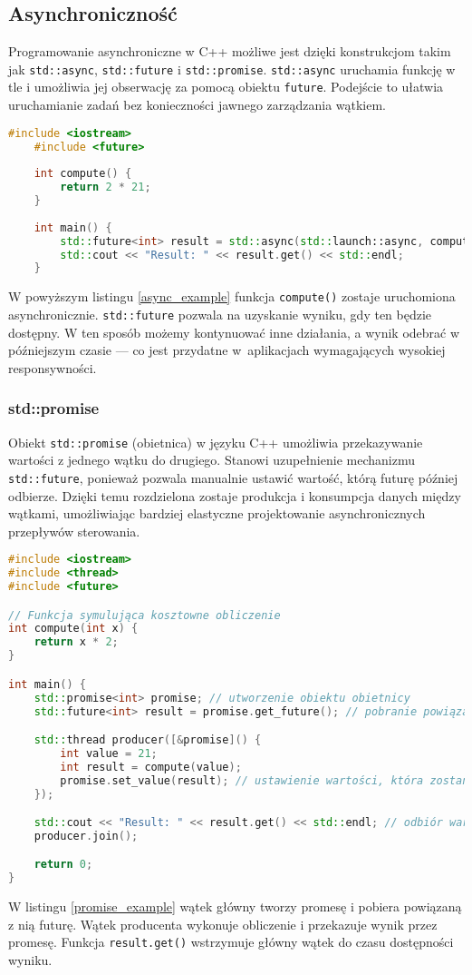 \subsection{Asynchroniczność}
Programowanie asynchroniczne w C++ możliwe jest dzięki konstrukcjom takim jak \texttt{std::async}, \texttt{std::future} i \texttt{std::promise}. \texttt{std::async} uruchamia funkcję w tle i umożliwia jej obserwację za pomocą obiektu \texttt{future}. Podejście to ułatwia uruchamianie zadań bez konieczności jawnego zarządzania wątkiem.

\begin{lstlisting}[language=C++, caption={Przykład użycia std::async}, label={async_example}]
    #include <iostream>
    #include <future>
    
    int compute() {
        return 2 * 21;
    }
    
    int main() {
        std::future<int> result = std::async(std::launch::async, compute);
        std::cout << "Result: " << result.get() << std::endl;
    }
\end{lstlisting}
W powyższym listingu \ref{async_example} funkcja \texttt{compute()} zostaje uruchomiona asynchronicznie. \texttt{std::future} pozwala na uzyskanie wyniku, gdy ten będzie dostępny. W ten sposób możemy kontynuować inne działania, a wynik odebrać w późniejszym czasie — co jest przydatne w~aplikacjach wymagających wysokiej responsywności.

\subsubsection{std::promise}
Obiekt \texttt{std::promise} (obietnica) w języku C++ umożliwia przekazywanie wartości z jednego wątku do drugiego. Stanowi uzupełnienie mechanizmu \texttt{std::future}, ponieważ pozwala manualnie ustawić wartość, którą futurę później odbierze. Dzięki temu rozdzielona zostaje produkcja i konsumpcja danych między wątkami, umożliwiając bardziej elastyczne projektowanie asynchronicznych przepływów sterowania.
\begin{lstlisting}[language=C++, caption={Przykład użycia std::promise}, label={promise_example}]
#include <iostream>
#include <thread>
#include <future>

// Funkcja symulująca kosztowne obliczenie
int compute(int x) {
    return x * 2;
}

int main() {
    std::promise<int> promise; // utworzenie obiektu obietnicy
    std::future<int> result = promise.get_future(); // pobranie powiązanego future

    std::thread producer([&promise]() {
        int value = 21;
        int result = compute(value);
        promise.set_value(result); // ustawienie wartości, która zostanie odebrana przez future
    });

    std::cout << "Result: " << result.get() << std::endl; // odbiór wartości, blokuje do czasu jej ustawienia
    producer.join();

    return 0;
}
\end{lstlisting}    
W listingu \ref{promise_example} wątek główny tworzy promesę i pobiera powiązaną z nią futurę. Wątek producenta wykonuje obliczenie i przekazuje wynik przez promesę. Funkcja \texttt{result.get()} wstrzymuje główny wątek do czasu dostępności wyniku.

